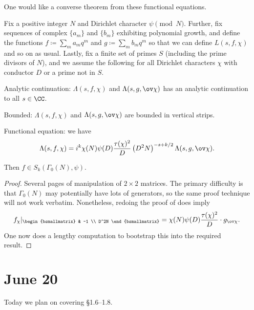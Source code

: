 \documentclass{article}
\begin{document}
One would like a converse theorem from these functional equations.
\begin{theorem}[Weil]
	Fix a positive integer $N$ and Dirichlet character $\psi\pmod N$. Further, fix sequences of complex $\{a_m\}$ and $\{b_m\}$ exhibiting polynomial growth, and define the functions $f\coloneqq\sum_{m}a_mq^m$ and $g\coloneqq\sum_mb_mq^m$ so that we can define $L(s,f,\chi)$ and so on as usual. Lastly, fix a finite set of primes $S$ (including the prime divisors of $N$), and we assume the following for all Dirichlet characters $\chi$ with conductor $D$ or a prime not in $S$.
	\begin{listalph}
		\item Analytic continuation: $\Lambda(s,f,\chi)$ and $\Lambda(s,g,\ov\chi)$ has an analytic continuation to all $s\in\CC$.
		\item Bounded: $\Lambda(s,f,\chi)$ and $\Lambda(s,g,\ov\chi)$ are bounded in vertical strips.
		\item Functional equation: we have
		\[\Lambda(s,f,\chi)=i^k\chi(N)\psi(D)\frac{\tau(\chi)^2}D\left(D^2N\right)^{-s+k/2}\Lambda(s,g,\ov\chi).\]
	\end{listalph}
	Then $f\in S_k(\Gamma_0(N),\psi)$.
\end{theorem}
\begin{proof}
	Several pages of manipulation of $2\times2$ matrices. The primary difficulty is that $\Gamma_0(N)$ may potentially have lots of generators, so the same proof technique will not work verbatim. Nonetheless, redoing the proof of  does imply
	\[f_\chi|_{\begin{bsmallmatrix}
		& -1 \\ D^2N
	\end{bsmallmatrix}}=\chi(N)\psi(D)\frac{\tau(\chi)^2}D\cdot g_{\ov\chi}.\]
	One now does a lengthy computation to bootstrap this into the required result.
\end{proof}

\section{June 20}
Today we plan on covering \S1.6--1.8.
\end{document}
